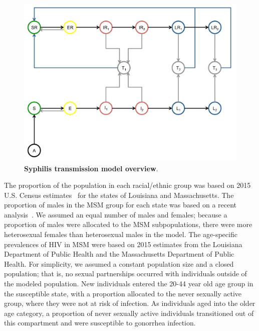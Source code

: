 \documentclass[a4paper]{article}
\begin{document}
\setcounter{figure}{0}
\renewcommand{\thefigure}{S\arabic{figure}}
\begin{figure}[ht] %

\includegraphics[width=\textwidth]{F1.png}

\caption{\color{Gray} \textbf{Syphilis transmission model overview}.}

\label{FigS1} 
\end{figure}

The proportion of the population in each racial/ethnic group was based on 2015 U.S. Census estimates~\autocite{NationalCenterforHealthStatistics.} for the states of Louisiana and Massachusetts. The proportion of males in the MSM group for each state was based on a recent analysis~\autocite{Grey2016}. We assumed an equal number of males and females; because a proportion of males were allocated to the MSM subpopulations, there were more heterosexual females than heterosexual males in the model. The age-specific prevalences of HIV in MSM were based on 2015 estimates from the Louisiana Department of Public Health and the Massachusetts Department of Public Health. For simplicity, we assumed a constant population size and a closed population; that is, no sexual partnerships occurred with individuals outside of the modeled population. New individuals entered the 20-44 year old age group in the susceptible state, with a proportion allocated to the never sexually active group, where they were not at risk of infection. As individuals aged into the older age category, a proportion of never sexually active individuals transitioned out of this compartment and were susceptible to gonorrhea infection. 
\end{document}
